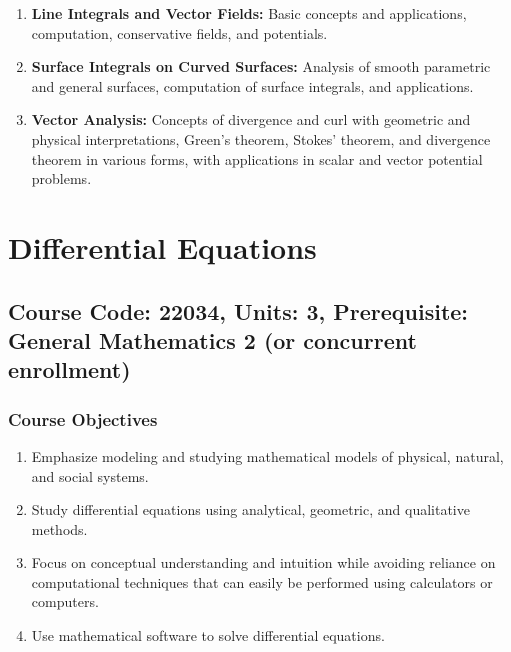 \documentclass[12pt]{article}
\begin{document}
\begin{enumerate}
    \item \textbf{Line Integrals and Vector Fields:} Basic concepts and applications, computation, conservative fields, and potentials.
    \item \textbf{Surface Integrals on Curved Surfaces:} Analysis of smooth parametric and general surfaces, computation of surface integrals, and applications.
    \item \textbf{Vector Analysis:} Concepts of divergence and curl with geometric and physical interpretations, Green's theorem, Stokes' theorem, and divergence theorem in various forms, with applications in scalar and vector potential problems.
\end{enumerate}

\newpage

\section{Differential Equations}
\subsection*{Course Code: 22034, Units: 3, Prerequisite: General Mathematics 2 (or concurrent enrollment)}

\subsubsection*{Course Objectives}
\begin{enumerate}
    \item Emphasize modeling and studying mathematical models of physical, natural, and social systems.
    \item Study differential equations using analytical, geometric, and qualitative methods.
    \item Focus on conceptual understanding and intuition while avoiding reliance on computational techniques that can easily be performed using calculators or computers.
    \item Use mathematical software to solve differential equations.
\end{enumerate}
\end{document}
